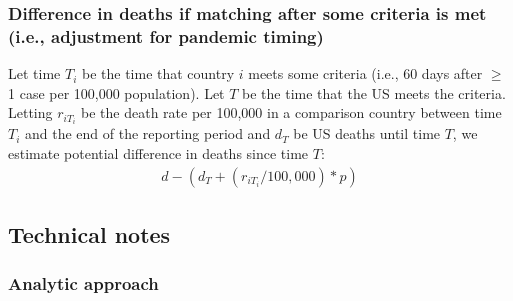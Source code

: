 \documentclass[
]{article}
\begin{document}
\hypertarget{difference-in-deaths-if-matching-after-some-criteria-is-met-i.e.-adjustment-for-pandemic-timing}{%
\subsubsection{Difference in deaths if matching after some criteria is
met (i.e., adjustment for pandemic
timing)}\label{difference-in-deaths-if-matching-after-some-criteria-is-met-i.e.-adjustment-for-pandemic-timing}}

Let time \(T_i\) be the time that country \(i\) meets some criteria
(i.e., 60 days after \(\geq\) 1 case per 100,000 population). Let \(T\)
be the time that the US meets the criteria. Letting \(r_{iT_i}\) be the
death rate per 100,000 in a comparison country between time \(T_i\) and
the end of the reporting period and \(d_{T}\) be US deaths until time
\(T\), we estimate potential difference in deaths since time \(T\):
\begin{align}
d - \left(d_{T} + \left(r_{iT_i}/100,000\right)*p\right)
\end{align}

\hypertarget{technical-notes}{%
\subsection{Technical notes}\label{technical-notes}}

\hypertarget{analytic-approach}{%
\subsubsection{Analytic approach}\label{analytic-approach}}
\end{document}
